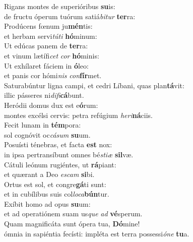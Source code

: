 \evenverse Rigans montes de superióribus \textbf{su}is:~\*\\
\evenverse de fructu óperum tuórum satiá\textit{bi}\textit{tur} \textbf{ter}ra:\\
\oddverse Prodúcens fœnum ju\textbf{mén}tis:~\*\\
\oddverse et herbam servi\textit{tú}\textit{ti} \textbf{hó}minum:\\
\evenverse Ut edúcas panem de \textbf{ter}ra:~\*\\
\evenverse et vinum lætífi\textit{cet} \textit{cor} \textbf{hó}minis:\\
\oddverse Ut exhílaret fáciem in \textbf{ó}leo:~\*\\
\oddverse et panis cor hómi\textit{nis} \textit{con}\textbf{fír}met.\\
\evenverse Saturabúntur ligna campi, et cedri Líbani, quas plan\textbf{tá}vit:~\*\\
\evenverse illic pásseres ni\textit{di}\textit{fi}\textbf{cá}bunt.\\
\oddverse Heródii domus dux est e\textbf{ó}rum:~\*\\
\oddverse montes excélsi cervis: petra refúgium \textit{he}\textit{ri}\textbf{ná}ciis.\\
\evenverse Fecit lunam in \textbf{tém}pora:~\*\\
\evenverse sol cognóvit oc\textit{cá}\textit{sum} \textbf{su}um.\\
\oddverse Posuísti ténebras, et facta \textbf{est} nox:~\*\\
\oddverse in ipsa pertransíbunt omnes bé\textit{sti}\textit{æ} \textbf{sil}væ.\\
\evenverse Cátuli leónum rugiéntes, ut \textbf{rá}piant:~\*\\
\evenverse et quærant a Deo \textit{e}\textit{scam} \textbf{si}bi.\\
\oddverse Ortus est sol, et congre\textbf{gá}ti sunt:~\*\\
\oddverse et in cubílibus suis col\textit{lo}\textit{ca}\textbf{bún}tur.\\
\evenverse Exíbit homo ad opus \textbf{su}um:~\*\\
\evenverse et ad operatiónem suam us\textit{que} \textit{ad} \textbf{vé}sperum.\\
\oddverse Quam magnificáta sunt ópera tua, \textbf{Dó}mine!~\*\\
\oddverse ómnia in sapiéntia fecísti: impléta est terra possessi\textit{ó}\textit{ne} \textbf{tu}a.\\
